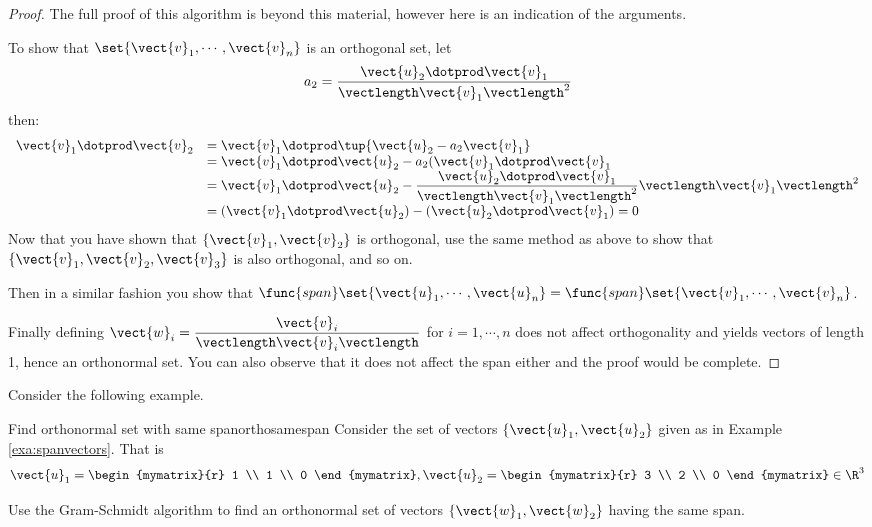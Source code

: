 \begin{proof}
The full proof of this algorithm is beyond this material, however here is an indication of the arguments. 

To show that  $\set{\vect{v}_1,\cdots , \vect{v}_n  } $ is an orthogonal set, let 
\[ a_2 =  \dfrac{ \vect{u}_2 \dotprod \vect{v}_1}{\vectlength \vect{v}_1 \vectlength^2} \]
then: 
\[
\begin{array}{ll}
 \vect{v}_1 \dotprod \vect{v}_2 &  =  \vect{v}_1 \dotprod \tup{\vect{u}_2 - a_2 \vect{v}_1 }  \\
 & = \vect{v}_1 \dotprod \vect{u}_2 - a_2 (\vect{v}_1 \dotprod \vect{v}_1  \\
 & = \vect{v}_1 \dotprod \vect{u}_2 - \dfrac{ \vect{u}_2 \dotprod \vect{v}_1}{\vectlength \vect{v}_1 \vectlength^2} \vectlength \vect{v}_1 \vectlength^2 \\
 & = ( \vect{v}_1 \dotprod \vect{u}_2 ) - ( \vect{u}_2 \dotprod \vect{v}_1 ) =0\\
\end{array}
\]
Now that you have shown that $\{\vect{v}_1, \vect{v}_2\}$ is orthogonal,  use the same method as above to show that 
$\{\vect{v}_1, \vect{v}_2, \vect{v}_3\}$ is also orthogonal,  and so on. 

Then in a similar fashion you show that $\func{span}\set{
\vect{u}_1,\cdots ,\vect{u}_n } = \func{span}\set{
\vect{v}_1,\cdots ,\vect{v}_n }$.

Finally defining $\vect{w}_i =
\dfrac{\vect{v}_i}{\vectlength\vect{v}_i\vectlength}$ for $i=1, \cdots
,n$ does not affect orthogonality and yields vectors of length 1,
hence an orthonormal set. You can also observe that it does not affect
the span either and the proof would be complete.
\end{proof}

Consider the following example.

\begin{example}{Find orthonormal set with same span}{orthosamespan}
Consider the set of vectors $\{\vect{u}_1, \vect{u}_2\}$ given as in Example \ref{exa:spanvectors}. That is  
\[
\vect{u}_1=\begin{mymatrix}{r}
1 \\
1 \\
0
\end{mymatrix}, \vect{u}_2=\begin{mymatrix}{r}
3 \\
2 \\
0
\end{mymatrix} \in \R^{3} 
\]

Use the Gram-Schmidt algorithm to find an orthonormal set of vectors $\{\vect{w}_1, \vect{w}_2\}$ having the same span.
\end{example}

